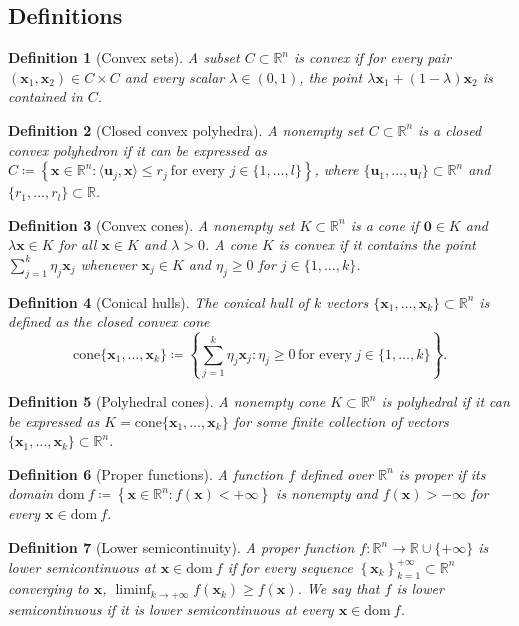 \documentclass[11pt]{article}
\numberwithin{prop}{section}
\numberwithin{lem}{section}
\numberwithin{rem}{section}
\numberwithin{cor}{section}
\numberwithin{thm}{section}
\newtheorem{defn}{Definition}
\numberwithin{defn}{section}
\numberwithin{fact}{section}
\theoremstyle{plain}
\def\bu {\boldsymbol{u}}
\def\bx {\boldsymbol{x}}
\def\R {\mathbb{R}}
\def\cone{\mathrm{cone}}
\def\dom {\mathrm{dom~}}    %
\def\Rn {\R^n}
\begin{document}
\subsection*{Definitions}
\begin{defn}[Convex sets] \label{def:convex_sets}
    A subset $C\subset \Rn$ is convex if for every pair $(\bx_{1},\bx_{2}) \in C \times C$ and every scalar $\lambda \in (0,1)$, the point $\lambda\bx_{1}+(1-\lambda)\bx_{2}$ is contained in $C$.
\end{defn}
%
\begin{defn}[Closed convex polyhedra]\label{def:convex_polyhedron}
    A nonempty set $C \subset \Rn$ is a closed convex polyhedron if it can be expressed as $C \coloneqq \left\{\bx \in \Rn : \langle\bu_{j},\bx\rangle \leqslant r_{j} \ \text{for every $j \in \{1,\dots,l\}$}  \right\}$, where $\{\bu_{1},\dots,\bu_{l}\} \subset \Rn$ and $\{r_{1},\dots,r_{l}\}\subset \R$.
\end{defn}
%
\begin{defn}[Convex cones]\label{def:convex_cones}
    A nonempty set $K \subset \Rn$ is a cone if $\boldsymbol{0} \in K$ and $\lambda\bx \in K$ for all $\bx \in K$ and $\lambda > 0$. A cone $K$ is convex if it contains the point $\sum_{j=1}^{k} \eta_{j}\bx_{j}$ whenever $\bx_{j} \in K$ and $\eta_{j} \geqslant 0$ for $j \in \{1,\dots,k\}$. 
\end{defn}
%
\begin{defn}[Conical hulls]\label{def:conical_hulls}
    The conical hull of $k$ vectors $\{\bx_{1},\dots,\bx_{k}\} \subset \Rn$ is defined as the closed convex cone
    \[
    \cone\{\bx_{1},\dots,\bx_{k}\} \coloneqq \left\{\sum_{j=1}^{k}\eta_{j}\bx_{j} : \eta_{j} \geqslant 0 \, \text{for every}\ j\in\{1,\dots,k\}\right\}.
    \]
\end{defn}
%
\begin{defn}[Polyhedral cones]
    A nonempty cone $K \subset \Rn$ is polyhedral if it can be expressed as $K = \cone\{\bx_{1},\dots,\bx_{k}\}$ for some finite collection of vectors $\{\bx_{1},\dots,\bx_{k}\} \subset \Rn$.
\end{defn}
%
\begin{defn}[Proper functions] \label{def:prop_f}
    A function $f$ defined over $\Rn$ is proper if its domain $\dom f \coloneqq \left\{ \bx \in \Rn : f(\bx) < +\infty\right\}$ is nonempty and $f(\bx) > -\infty$ for every $\bx \in \dom f$.
\end{defn}
%
\begin{defn}[Lower semicontinuity] \label{def:lsc_f}
    A proper function $f\colon\Rn\to\R\cup\{+\infty\}$ is lower semicontinuous at $\bx \in \dom f$ if for every sequence $\left\{ \bx_k\right\} _{k=1}^{+\infty} \subset \Rn$ converging to $\bx$, $\liminf_{k\to+\infty}f(\bx_k)\geqslant f(\bx)$. We say that $f$ is lower semicontinuous if it is lower semicontinuous at every $\bx \in \dom f$.
\end{defn}
\end{document}
